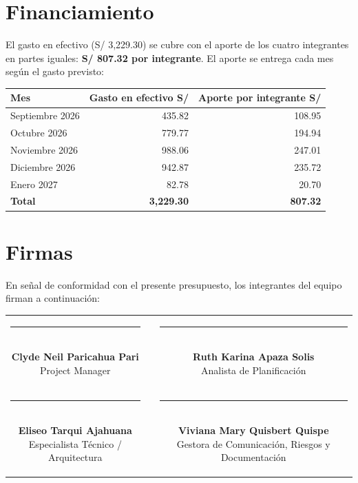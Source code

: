 \documentclass[11pt,a4paper]{article}
\begin{document}
\section{Financiamiento}
El gasto en efectivo (S/ 3,229.30) se cubre con el aporte de los cuatro integrantes en partes iguales: \textbf{S/ 807.32 por integrante}. El aporte se entrega cada mes según el gasto previsto:

\vspace{0.1cm}
{\small
{}
\noindent\begin{tabularx}{\textwidth}{@{}L R R@{}}
\toprule
{}
\textbf{Mes} & \textbf{Gasto en efectivo S/} & \textbf{Aporte por integrante S/} \\
\midrule
Septiembre 2026 & 435.82 & 108.95 \\
Octubre 2026 & 779.77 & 194.94 \\
Noviembre 2026 & 988.06 & 247.01 \\
Diciembre 2026 & 942.87 & 235.72 \\
Enero 2027 & 82.78 & 20.70 \\
\midrule
{}\textbf{Total} & \textbf{3,229.30} & \textbf{807.32} \\
\bottomrule
\end{tabularx}
}

\section{Firmas}
\noindent En señal de conformidad con el presente presupuesto, los integrantes del equipo firman a continuación:

\vspace{1.5cm}
\begin{center}
\begin{tabular}{c c c}
    \parbox{6.5cm}{\centering \rule{6.0cm}{0.6pt}\\[5pt] \textbf{Clyde Neil Paricahua Pari}\\[2pt] {\footnotesize Project Manager}}
    & \hspace{0.8cm} &
    \parbox{6.5cm}{\centering \rule{6.0cm}{0.6pt}\\[5pt] \textbf{Ruth Karina Apaza Solis}\\[2pt] {\footnotesize Analista de Planificación}}
    \\[2.0cm]
    \parbox{6.5cm}{\centering \rule{6.0cm}{0.6pt}\\[5pt] \textbf{Eliseo Tarqui Ajahuana}\\[2pt] {\footnotesize Especialista Técnico / Arquitectura}}
    & \hspace{0.8cm} &
    \parbox{6.5cm}{\centering \rule{6.0cm}{0.6pt}\\[5pt] \textbf{Viviana Mary Quisbert Quispe}\\[2pt] {\footnotesize Gestora de Comunicación, Riesgos y Documentación}}
\end{tabular}
\end{center}
\end{document}
